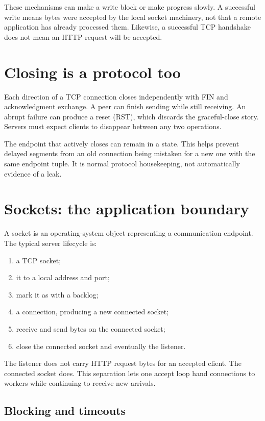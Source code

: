 These mechanisms can make a write block or make progress slowly. A successful
write means bytes were accepted by the local socket machinery, not that a remote
application has already processed them. Likewise, a successful TCP handshake
does not mean an HTTP request will be accepted.

\section{Closing is a protocol too}

Each direction of a TCP connection closes independently with FIN and
acknowledgment exchange. A peer can finish sending while still receiving. An
abrupt failure can produce a reset (RST), which discards the graceful-close
story. Servers must expect clients to disappear between any two operations.

The endpoint that actively closes can remain in a  state. This
helps prevent delayed segments from an old connection being mistaken for a new
one with the same endpoint tuple. It is normal protocol housekeeping, not
automatically evidence of a leak.

\section{Sockets: the application boundary}

A socket is an operating-system object representing a communication endpoint.
The typical server lifecycle is:

\begin{enumerate}
  \item {} a TCP socket;
  \item {} it to a local address and port;
  \item mark it as  with a backlog;
  \item {} a connection, producing a new connected socket;
  \item receive and send bytes on the connected socket;
  \item close the connected socket and eventually the listener.
\end{enumerate}

The listener does not carry HTTP request bytes for an accepted client. The
connected socket does. This separation lets one accept loop hand connections to
workers while continuing to receive new arrivals.

\subsection{Blocking and timeouts}

